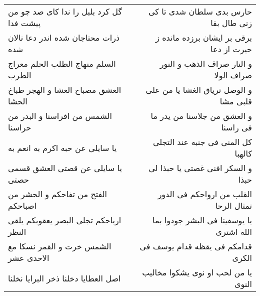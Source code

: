 \begin{center}
\begin{longtable}{l p{0.5cm} r}
گل کرد بلبل را ندا کای صد چو من پیشت فدا
&&
حارس بدی سلطان شدی تا کی زنی طال بقا
\\
ذرات محتاجان شده اندر دعا نالان شده
&&
برقی بر ایشان برزده مانده ز حیرت از دعا
\\
السلم منهاج الطلب الحلم معراج الطرب
&&
و النار صراف الذهب و النور صراف الولا
\\
العشق مصباح العشا و الهجر طباخ الحشا
&&
و الوصل تریاق الغشا یا من علی قلبی مشا
\\
الشمس من افراسنا و البدر من حراسنا
&&
و العشق من جلاسنا من یدر ما فی راسنا
\\
یا سایلی عن حبه اکرم به انعم به
&&
کل المنی فی جنبه عند التجلی کالهبا
\\
یا سایلی عن قصتی العشق قسمی حصتی
&&
و السکر افنی غصتی یا حبذا لی حبذا
\\
الفتح من تفاحکم و الحشر من اصباحکم
&&
القلب من ارواحکم فی الدور تمثال الرحا
\\
اریاحکم تجلی البصر یعقوبکم یلقی النظر
&&
یا یوسفینا فی البشر جودوا بما الله اشتری
\\
الشمس خرت و القمر نسکا مع الاحدی عشر
&&
قدامکم فی یقظه قدام یوسف فی الکری
\\
اصل العطایا دخلنا ذخر البرایا نخلنا
&&
یا من لحب او نوی یشکوا مخالیب النوی
\\
\end{longtable}
\end{center}
